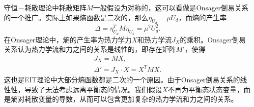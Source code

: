 	
	守恒－耗散理论中耗散矩阵$M$一般假设为对称的，这可以看做是Onsager倒易关系的一个推广。实际上如果熵函数是二次的，那么$\eta_{U_d} = \mu U_d$，而熵的产生率
	\begin{equation*}
		\Delta = \eta_{U_d}^T M \eta_{U_d} = \mu^2 U_d^2.
	\end{equation*}
	在Onsager理论中，熵的产生率为热力学力$X$和热力学流$J_X$的乘积。Onsager倒易关系认为热力学流和力之间的关系是线性的，即存在矩阵$M'$，使得
	\begin{eqnarray*}
		J_X = M X ,\\
		\Delta'= J_X \cdot X = X^T M X.
	\end{eqnarray*}
	这也是EIT理论中大部分熵函数都是二次的一个原因。由于Onsager倒易关系的线性性，导致了无法考虑远离平衡态的情况。我们假设$X$不再为平衡态状态变量，而是熵对耗散变量的导数，从而可以包含更加复杂的热力学流和力之间的关系。

